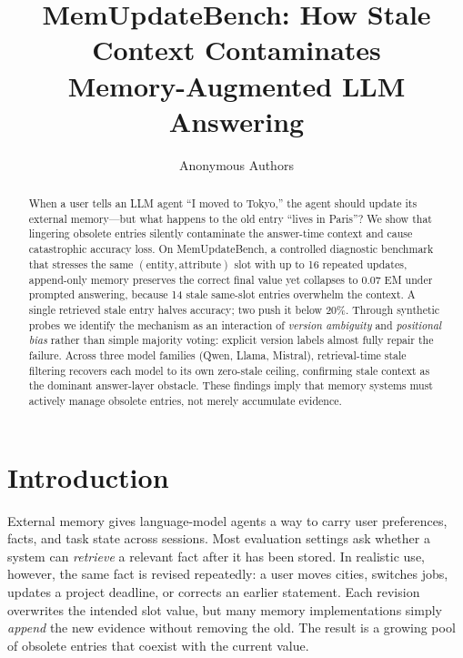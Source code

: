 \documentclass[11pt,twocolumn]{article}
\title{MemUpdateBench: How Stale Context Contaminates\\Memory-Augmented LLM Answering}
\author{Anonymous Authors}
\date{}
\begin{document}
\maketitle

\begin{abstract}
When a user tells an LLM agent ``I moved to Tokyo,'' the agent should update its external memory---but what happens to the old entry ``lives in Paris''?
We show that lingering obsolete entries silently contaminate the answer-time context and cause catastrophic accuracy loss.
On MemUpdateBench, a controlled diagnostic benchmark that stresses the same \((\text{entity},\text{attribute})\) slot with up to 16 repeated updates, append-only memory preserves the correct final value yet collapses to 0.07 EM under prompted answering, because 14 stale same-slot entries overwhelm the context.
A single retrieved stale entry halves accuracy; two push it below 20\%.
Through synthetic probes we identify the mechanism as an interaction of \emph{version ambiguity} and \emph{positional bias} rather than simple majority voting: explicit version labels almost fully repair the failure.
Across three model families (Qwen, Llama, Mistral), retrieval-time stale filtering recovers each model to its own zero-stale ceiling, confirming stale context as the dominant answer-layer obstacle.
These findings imply that memory systems must actively manage obsolete entries, not merely accumulate evidence.
\end{abstract}

\section{Introduction}

External memory gives language-model agents a way to carry user preferences, facts, and task state across sessions.
Most evaluation settings ask whether a system can \emph{retrieve} a relevant fact after it has been stored.
In realistic use, however, the same fact is revised repeatedly: a user moves cities, switches jobs, updates a project deadline, or corrects an earlier statement.
Each revision overwrites the intended slot value, but many memory implementations simply \emph{append} the new evidence without removing the old.
The result is a growing pool of obsolete entries that coexist with the current value.
\end{document}
